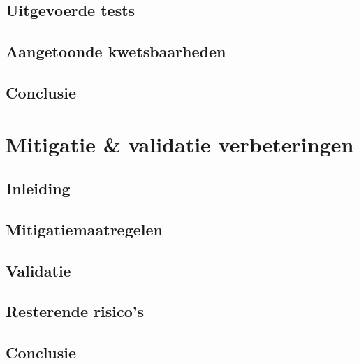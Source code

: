 \documentclass[11pt, a4paper]{report}
\begin{document}
\section{Uitgevoerde tests}

\section{Aangetoonde kwetsbaarheden}

\section{Conclusie}


\chapter{Mitigatie \& validatie verbeteringen}

\section{Inleiding}

\section{Mitigatiemaatregelen}

\section{Validatie}

\section{Resterende risico's}

\section{Conclusie}


\end{document}
